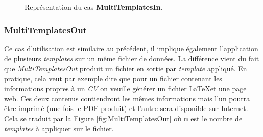 				\begin{figure}
					\begin{center}
						\caption{Représentation du cas \textbf{MultiTemplatesIn}.}
						\label{fig:MultiTemplatesIn}
					\end{center}
				\end{figure}
				
			
			\subsubsection*{MultiTemplatesOut}
				Ce cas d'utilisation est similaire au précédent, il implique également l'application de plusieurs \textit{templates} sur un même fichier de données. La différence vient du fait que \textit{MultiTemplatesOut} produit un fichier en sortie par \textit{template} appliqué. En pratique, cela veut par exemple dire que pour un fichier contenant les informations propres à un \textit{CV} on veuille générer un fichier \LaTeX et une page web. Ces deux contenus contiendront les mêmes informations mais l'un pourra être imprimé (une fois le PDF produit) et l'autre sera disponible sur Internet. Cela se traduit par la Figure \ref{fig:MultiTemplatesOut} où \textbf{n} est le nombre de \textit{templates} à appliquer sur le fichier.
				
